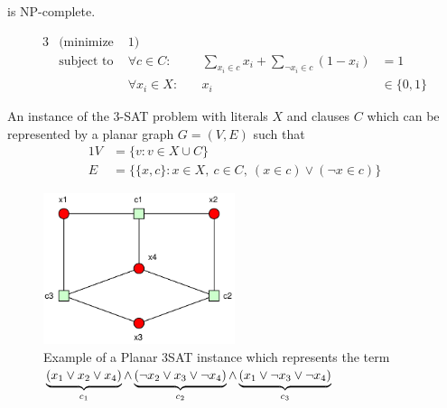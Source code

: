
\begin{theorem}
   is NP-complete.~\cite[Satisfiability with at most %
  3 Literals per Clause]{karp_np_complete}
\end{theorem}


\begin{problem}
  \begin{alignat*}{3}
    &(\text{minimize } & 1) \\
    &\text{subject to } & \forall c \in C : &~
    & \sum\limits_{x_i \in c} x_i + \sum\limits_{\lnot x_i \in c} (1 - x_i) &= 1 \\
    && \forall x_i \in X : &~& x_i &\in \{0,1\}
  \end{alignat*}
\end{problem}


\begin{problem}
  \label{prob:planar_3SAT}
  An instance of the 3-SAT problem with literals \(X\) and
  clauses \(C\) which can be represented by a planar graph
  \(G = (V,E)\) such that
  \begin{alignat*}{1}
    V &= \{v : v \in X \cup C\} \\
    E &= \{ \{x, c\} :
      x \in X,~
      c \in C,~
      (x \in c) \lor (\lnot x \in c)
    \}
  \end{alignat*}
\end{problem}


\begin{figure}[ht]
  \centering
  \includegraphics[width=0.5\textwidth]{img/example_planar_3SAT.pdf}
  \caption{\label{fig:example_planar_3SAT}Example of a Planar 3SAT %
    instance which represents the term \(%
      \protect\underbrace{(x_1 \lor x_2 \lor x_4)}_{c_1}\land%
      \protect\underbrace{(\lnot x_2 \lor x_3 \lor \lnot x_4)}_{c_2}\land%
      \protect\underbrace{(x_1 \lor \lnot x_3 \lor \lnot x_4)}_{c_3}%
    \)}
\end{figure}

